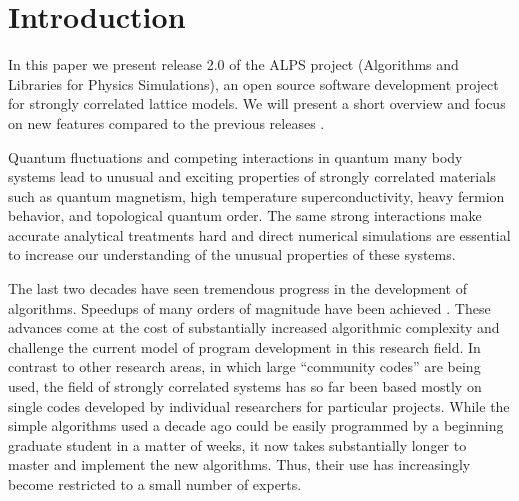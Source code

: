 \documentclass[12pt]{iopart}
\begin{document}
\section{Introduction}
\label{}

In this paper we present release 2.0 of the ALPS project  (Algorithms and Libraries for Physics Simulations), an open source software development project for strongly correlated lattice models. We will present a short overview  and focus on new features compared to the previous releases \cite{ALPS1.2,ALPS1.3}.

Quantum fluctuations and competing interactions in quantum many body
systems lead to unusual and exciting properties of strongly correlated
materials such as quantum magnetism, high temperature
superconductivity, heavy fermion
behavior, and topological quantum order.
The same strong interactions make accurate analytical treatments hard and 
direct numerical simulations are essential to increase our understanding of the unusual
properties of these systems. 

The last two decades have seen tremendous progress in the development of
algorithms.  Speedups of many orders of magnitude have been 
achieved \cite{Evertz03,Troyer03,White1992,Schollwock2005,vidal1,vidal2,Daley2004,White2004,Rubtsov04,Rubtsov05,Werner06,Werner06Kondo, Gull08_ctaux}. These
advances come at the cost of substantially increased algorithmic
complexity and challenge the current model of program development in
this research field. In contrast to other research areas, in which
large ``community codes'' are being used, the field of strongly
correlated systems has so far been based mostly on single codes developed by
individual researchers for particular projects. While the simple
algorithms used a decade ago could be easily programmed by a beginning
graduate student in a matter of weeks, it now takes substantially
longer to master and implement the new algorithms.  Thus, their use
has increasingly become restricted to a small number of experts.
\end{document}

